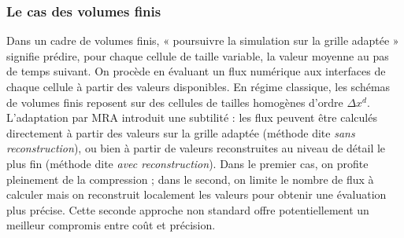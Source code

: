 \subsubsection{Le cas des volumes finis}
Dans un cadre de volumes finis, « poursuivre la simulation sur la grille adaptée » signifie prédire, pour chaque cellule de taille variable, 
la valeur moyenne au pas de temps suivant. On procède en évaluant un flux numérique aux interfaces de chaque cellule à partir des valeurs disponibles.
En régime classique, les schémas de volumes finis reposent sur des cellules de tailles homogènes d'ordre $\Delta x^d$. 
L'adaptation par MRA introduit une subtilité : les flux peuvent être calculés directement à partir des valeurs sur la grille adaptée (méthode dite \emph{sans reconstruction}), 
ou bien à partir de valeurs reconstruites au niveau de détail le plus fin (méthode dite \emph{avec reconstruction}). 
Dans le premier cas, on profite pleinement de la compression ; dans le second, on limite le nombre de flux à calculer mais on reconstruit localement les valeurs pour obtenir une évaluation plus précise. 
Cette seconde approche non standard offre potentiellement un meilleur compromis entre coût et précision.

